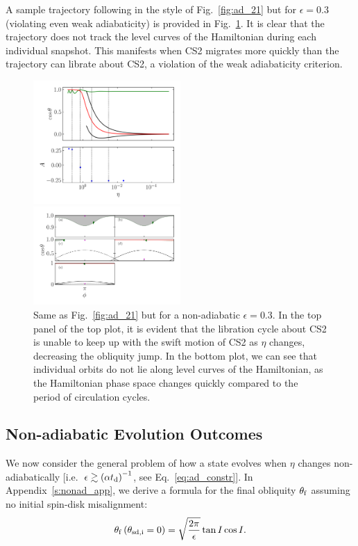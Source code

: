 \documentclass[
        fleqn,
        usenatbib,
    ]{mnras}
\newcommand*{\p}[1]{\left(#1\right)}
\begin{document}
A sample trajectory following in the style of Fig.~\ref{fig:ad_21} but for
$\epsilon = 0.3$ (violating even weak adiabaticity) is provided in
Fig.~\ref{fig:nonad_traj}. It is clear that the trajectory does not track the
level curves of the Hamiltonian during each individual snapshot. This manifests
when CS2 migrates more quickly than the trajectory can librate about CS2, a
violation of the weak adiabaticity criterion.
\begin{figure}
    \centering
    \includegraphics[width=0.5\textwidth]{plots_diskdisp/3testo_nonad.png}

    \includegraphics[width=0.5\textwidth]{plots_diskdisp/3testo_nonad_subplots.png}
    \caption{Same as Fig.~\ref{fig:ad_21} but for a non-adiabatic $\epsilon =
    0.3$. In the top panel of the top plot, it is evident that the libration
    cycle about CS2 is unable to keep up with the swift motion of CS2 as $\eta$
    changes, decreasing the obliquity jump. In the bottom plot, we can see that
    individual orbits do not lie along level curves of the Hamiltonian, as the
    Hamiltonian phase space changes quickly compared to the period of
    circulation cycles.}\label{fig:nonad_traj}
\end{figure}

\subsection{Non-adiabatic Evolution Outcomes}

We now consider the general problem of how a state evolves when $\eta$ changes
non-adiabatically [i.e.\ $\epsilon \gtrsim \p{\alpha t_{\rm d}}^{-1}$, see
Eq.~\eqref{eq:ad_constr}]. In Appendix~\ref{s:nonad_app}, we derive a formula
for the final obliquity $\theta_{\rm f}$ assuming no initial spin-disk
misalignment:
\begin{equation}
    \theta_{\rm f}\p{\theta_{\rm sd, i} = 0} = \sqrt{\frac{2\pi}{\epsilon}} \tan
        I\cos I.\label{eq:nonad_q_f}
\end{equation}
\end{document}
